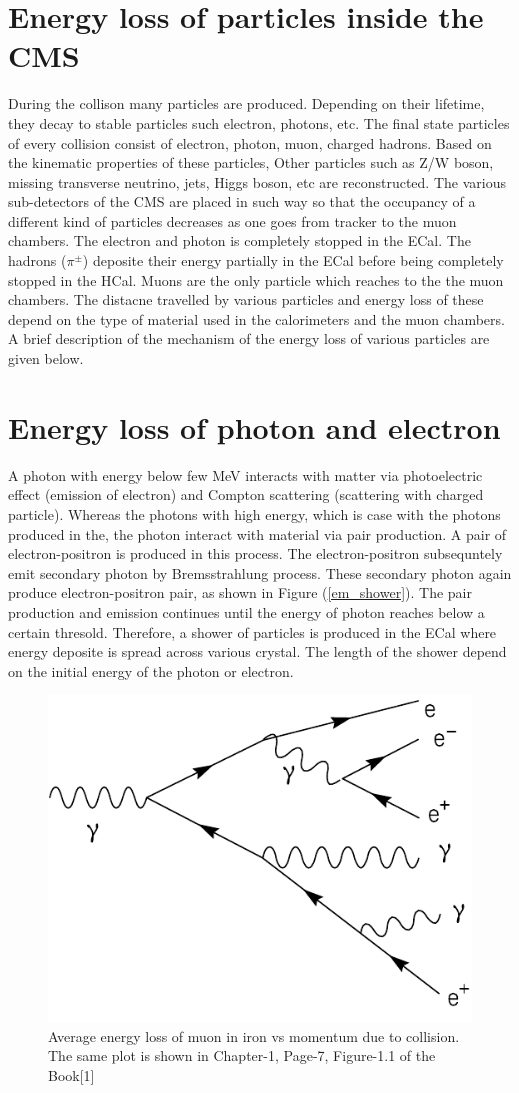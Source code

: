 
\section{Energy loss of particles inside the CMS}
During the collison many particles are produced. Depending on their lifetime, 
they decay to stable particles such electron, photons, etc. The final state 
particles of every collision consist of electron, photon, muon, charged hadrons. 
Based on the kinematic properties of these particles, Other particles such as 
Z/W boson, missing transverse neutrino, jets, Higgs boson, etc are reconstructed.
The various sub-detectors of the CMS are placed in such way so that the occupancy
of a different kind of particles decreases as one goes from tracker to the muon
chambers. The electron and photon is completely stopped in the ECal. The hadrons
($\pi^{\pm}$) deposite their energy partially in the ECal before being completely
stopped in the HCal. Muons are the only particle which reaches to the the muon
chambers. The distacne travelled by various particles and energy loss of these
depend on the type of material used in the calorimeters and the muon chambers.
A brief description of the mechanism of the energy loss of various particles
are given below.

\section{Energy loss of photon and electron}
A photon with energy below few MeV interacts with matter via photoelectric 
effect (emission of electron) and Compton scattering (scattering with charged 
particle). Whereas the photons with high energy, which is case with the photons 
produced in the, the photon interact with material via pair production. A pair
of electron-positron is produced in this process. The electron-positron
subsequntely emit secondary photon by Bremsstrahlung process. These secondary
photon again produce electron-positron pair, as shown in Figure 
(\ref{em_shower}). The pair production and emission continues until the energy
of photon reaches below a certain thresold. Therefore, a shower of particles is
produced in the ECal where energy deposite is spread across various crystal. 
The length of the shower depend on the initial energy of the photon or electron.
\begin{figure}
    \centering
    \includegraphics[width=0.50\linewidth]{Experiment/CMS/Image/Loss/em_shower.pdf}
    \caption{Average energy loss of muon in iron vs momentum due to collision. The same plot is shown in Chapter-1, Page-7, Figure-1.1 of the Book[1]}
    \label{fig:em_shower}
\end{figure}

